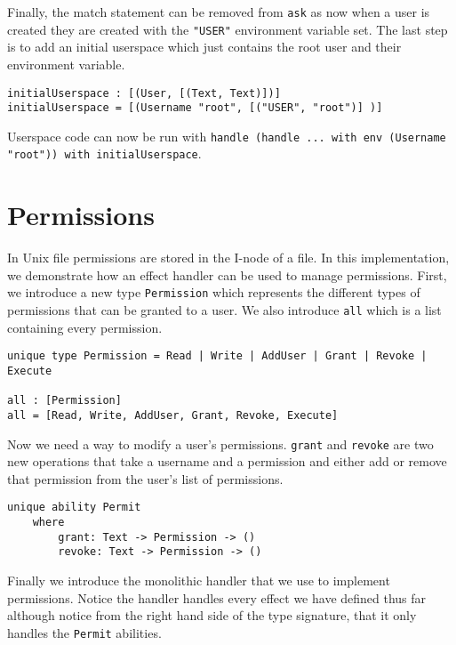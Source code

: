 \documentclass[logo,bsc,singlespacing,parskip]{infthesis}
\begin{document}
Finally, the match statement can be removed from \texttt{ask} as now when a user is created they are created with the \texttt{"USER"} environment variable set. The last step is to add an initial userspace which just contains the root user and their environment variable.

\begin{lstlisting}[language=unison]
initialUserspace : [(User, [(Text, Text)])]
initialUserspace = [(Username "root", [("USER", "root")] )]
\end{lstlisting}

Userspace code can now be run with \texttt{handle (handle ... with env (Username "root")) with initialUserspace}.


\section{Permissions}
\label{permissions}

In Unix file permissions are stored in the I-node of a file.
In this implementation, we demonstrate how an effect handler can be used to manage permissions.
First, we introduce a new type \texttt{Permission} which represents the different types of permissions that can be granted to a user. We also introduce \texttt{all} which is a list containing every permission.

\begin{lstlisting}[language=unison]
unique type Permission = Read | Write | AddUser | Grant | Revoke | Execute

all : [Permission]
all = [Read, Write, AddUser, Grant, Revoke, Execute]
\end{lstlisting}

Now we need a way to modify a user's permissions. \texttt{grant} and \texttt{revoke} are two new operations that take a username and a permission and either add or remove that permission from the user's list of permissions.

\begin{lstlisting}[language=unison]
unique ability Permit 
    where 
        grant: Text -> Permission -> ()
        revoke: Text -> Permission -> ()
\end{lstlisting}

Finally we introduce the monolithic handler that we use to implement permissions. Notice the handler handles every effect we have defined thus far although notice from the right hand side of the type signature, that it only handles the \texttt{Permit} abilities.
\end{document}
